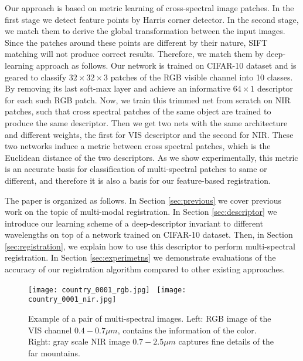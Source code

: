 \documentclass[10pt,twocolumn,letterpaper]{article}
\begin{document}
Our approach is based on metric learning of cross-spectral image patches. In the first stage we detect feature points by Harris \cite{harris} corner detector. In the second stage, we match them to derive the global transformation between the input images. Since the patches around these points are different by their nature, SIFT \cite{SIFT} matching will not produce correct results. Therefore, we match them by deep-learning approach as follows. Our network is trained on CIFAR-10 \cite{krizhevsky2009learning} dataset and is geared to classify $32\times 32\times 3$ patches of the RGB visible channel into 10 classes. By removing its last soft-max layer and achieve an informative $64\times 1$ descriptor for each such RGB patch. Now, we train this trimmed net from scratch on NIR patches, such that cross spectral patches of the same object are trained to produce the same descriptor. Then we get two nets with the same architecture and different weights, the first for VIS descriptor and the second for NIR. These two networks induce a metric between cross spectral patches, which is the Euclidean distance of the two descriptors. As we show experimentally, this metric is an accurate basis for classification of multi-spectral patches to same or different, and therefore it is also a basis for our feature-based registration.

The paper is organized as follows. In Section \ref{sec:previous} we cover previous work on the topic of multi-modal registration. In Section \ref{sec:descriptor} we introduce our learning scheme of a deep-descriptor invariant to different wavelengths on top of a network trained on CIFAR-10 dataset. Then, in Section \ref{sec:registration}, we explain how to use this descriptor to perform multi-spectral registration. In Section \ref{sec:experimetns} we demonstrate evaluations of the accuracy of our registration algorithm compared to other existing approaches.

\begin{figure}
	\centering
	\texttt{[image: country\_0001\_rgb.jpg]}~
	\texttt{[image: country\_0001\_nir.jpg]}
	
	\caption{Example of a pair of multi-spectral images. Left: RGB image of the VIS channel $0.4-0.7\mu m$, contains the information of the color. Right: gray scale NIR image $0.7-2.5\mu m$ captures fine details of the far mountains.}
	\label{fig:1}       %
\end{figure}
\end{document}
